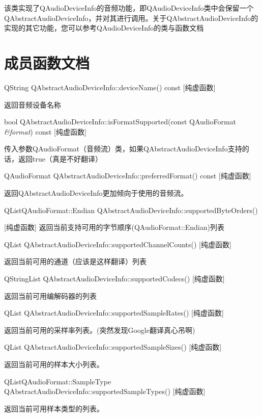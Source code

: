 该类实现了QAudioDeviceInfo的音频功能，即QAudioDeviceInfo类中会保留一个QAbstractAudioDeviceInfo，并对其进行调用。关于QAbstractAudioDeviceInfo的实现的其它功能，您可以参考QAudioDeviceInfo的类与函数文档

\section{成员函数文档}

QString QAbstractAudioDeviceInfo::deviceName() const [纯虚函数] 

返回音频设备名称

bool QAbstractAudioDeviceInfo::isFormatSupported(const QAudioFormat \emph{\&format}) const [纯虚函数] 

传入参数QAudioFormat（音频流）类，如果QAbstractAudioDeviceInfo支持的话，返回true（真是不好翻译）

QAudioFormat QAbstractAudioDeviceInfo::preferredFormat() const [纯虚函数]

返回QAbstractAudioDeviceInfo更加倾向于使用的音频流。

QListQAudioFormat::Endian QAbstractAudioDeviceInfo::supportedByteOrders() 

[纯虚函数] 返回当前支持可用的字节顺序(QAudioFormat::Endian)列表

QList QAbstractAudioDeviceInfo::supportedChannelCounts() [纯虚函数] 

返回当前可用的通道（应该是这样翻译）列表

QStringList QAbstractAudioDeviceInfo::supportedCodecs() [纯虚函数] 

返回当前可用编解码器的列表

QList QAbstractAudioDeviceInfo::supportedSampleRates() [纯虚函数] 

返回当前可用的采样率列表。(突然发现Google翻译真心吊啊)

QList QAbstractAudioDeviceInfo::supportedSampleSizes() [纯虚函数] 

返回当前可用的样本大小列表。

QListQAudioFormat::SampleType QAbstractAudioDeviceInfo::supportedSampleTypes() [纯虚函数] 

返回当前可用样本类型的列表。